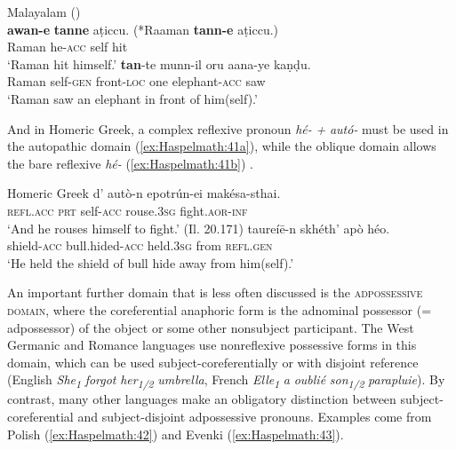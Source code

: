 \documentclass[output=paper]{langscibook}
\begin{document}
\ea%
   Malayalam (\citealt[121,126]{Jayaseelan2000})\\ \label{ex:Haspelmath:40}
    \ea \label{ex:Haspelmath:40a}
      \textbf{{awan-e}} \textbf{{tanne}} {aṭiccu.}    ({*Raaman} \textbf{{tann-e}} {aṭiccu}.)\\
      Raman  he-\textsc{acc}  self  hit  \\
    \glt ‘Raman hit himself.’
    \ex \label{ex:Haspelmath:40b}
      \textbf{{tan}}{-te}  {munn-il}  {oru}  {aana-ye}  {kaṇḍu.}\\
    Raman  self-\textsc{gen}  front-\textsc{loc}  one  elephant-\textsc{acc}  saw\\
    \glt ‘Raman saw an elephant in front of him(self).’
    \z
\z 

And in Homeric Greek, a complex reflexive pronoun \textit{hé-} \textit{+} \textit{autó-} must be used in the autopathic domain (\ref{ex:Haspelmath:41a}), while the oblique domain allows the bare reflexive \textit{hé-} (\ref{ex:Haspelmath:41b}) \citep[86-87]{Kiparsky2012}.

\ea%
    Homeric Greek\label{ex:Haspelmath:41}
    \ea \label{ex:Haspelmath:41a}
      {d’}  {autò-n}  {epotrún-ei}  {makésa-sthai.}\\
       \textsc{refl}.\textsc{acc}  \textsc{prt}  self-\textsc{acc}  rouse.\textsc{3sg}  fight.\textsc{aor}{}-\textsc{inf}  \\
    \glt‘And he rouses himself to fight.’ ({Il.} 20.171)
    \ex \label{ex:Haspelmath:41b}
      {taureíē-n}  {skhéth’}  {apò}  {héo.}\\
       shield-\textsc{acc}  bull.hided-\textsc{acc}  held.\textsc{3sg}  from  \textsc{refl}.\textsc{gen} \\
    \glt ‘He held the shield of bull hide away from him(self).’
    \z
\z 
          
An important further domain that is less often discussed is the \textsc{adpossessive} \textsc{domain}, where the coreferential anaphoric form is the adnominal possessor (= adpossessor) of the object or some other nonsubject participant. The West Germanic and Romance languages use nonreflexive possessive forms in this domain, which can be used subject-coreferentially or with disjoint reference (English \textit{She\textsubscript{1}} \textit{forgot} \textit{her\textsubscript{1/2} }\textit{umbrella}, French \textit{Elle\textsubscript{1}} \textit{a} \textit{oublié} \textit{son\textsubscript{1/2} }\textit{parapluie}). By contrast, many other languages make an obligatory distinction between subject-coreferential and subject-disjoint adpossessive pronouns. Examples come from Polish (\ref{ex:Haspelmath:42}) and Evenki (\ref{ex:Haspelmath:43}).
\end{document}
